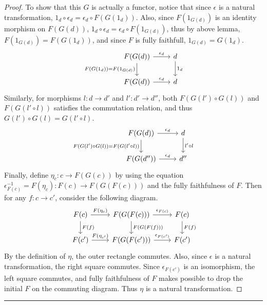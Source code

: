 \begin{proof}
To show that this $G$ is actually a functor, notice that since $\epsilon$ is a natural transformation, $1_d\circ \epsilon_d=\epsilon_d\circ F(G(1_d))$. Also, since $F(1_{G(d)})$ is an identity morphism on $F(G(d))$, $1_d\circ \epsilon_d=\epsilon_d\circ F(1_{G(d)})$, thus by above lemma, $F(1_{G(d)})=F(G(1_d))$, and since $F$ is fully faithfull, $1_{G(d)}=G(1_d)$. 
\begin{equation}
\begin{tikzcd}
F(G(d))\arrow{r}{\epsilon_d} \arrow[swap]{d}{F(G(1_d))=F(1_{G(d)})} & d\arrow{d}{1_d}\\
F(G(d))\arrow{r}{\epsilon_d} & d
\end{tikzcd}
\end{equation}
Similarly, for morphisms $l:d\rightarrow d'$ and $l':d'\rightarrow d''$, both $F(G(l')\circ G(l))$ and $F(G(l'\circ l))$ satisfies the commutation relation, and thus $G(l')\circ G(l)=G(l'\circ l)$.
\begin{equation}
\begin{tikzcd}
F(G(d))\arrow{r}{\epsilon_d} \arrow[swap]{d}{F(G(l')\circ G(l))=F(G(l'\circ l))} & d\arrow{d}{l'\circ l}\\
F(G(d''))\arrow{r}{\epsilon_d} & d''
\end{tikzcd}
\end{equation}
Finally, define $\eta_c:c\rightarrow F(G(c))$ by using the equation $\epsilon_{F(c)}^{-1}=F(\eta_c):F(c)\rightarrow F(G(F(c)))$ and the fully faithfulness of $F$. Then for any $f:c\rightarrow c'$, consider the following diagram.
\begin{equation}
\begin{tikzcd}
F(c)\arrow{r}{F(\eta_c)}\arrow{d}{F(f)} & F(G(F(c))) \arrow{r}{\epsilon_{F(c)}} \arrow{d}{F(G(F(f)))} & F(c)\arrow{d}{F(f)}\\
F(c')\arrow{r}{F(\eta_{c'})} & F(G(F(c'))) \arrow{r}{\epsilon_{F(c')}} & F(c')
\end{tikzcd}
\end{equation}
By the definition of $\eta$, the outer rectangle commutes. Also, since $\epsilon$ is a natural transformation, the right square commutes. Since $\epsilon_{F(c')}$ is an isomorphism, the left square commutes, and fully faithfulness of $F$ makes possible to drop the initial $F$ on the commuting diagram. Thus $\eta$ is a natural transformation.
\end{proof}
\noindent\rule{\textwidth}{1pt}
\newline